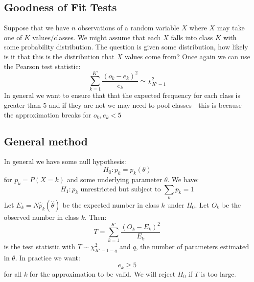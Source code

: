 \documentclass[12pt]{article}
\begin{document}
\subsection{Goodness of Fit Tests}
Suppose that we have \(n\) observations of a random variable \(X\) where \(X\) may take one of \(K\) values/classes. We might assume that each \(X\) falls into class \(K\) with some probability distribution. The question is given some distribution, how likely is it that this is the distribution that \(X\) values come from? Once again we can use the Pearson test statistic:
\[\sum^{K'}_{k=1}\frac{(o_k-e_k)^2}{e_k}\sim\chi^2_{K'-1}\]
In general we want to ensure that that the expected frequency for each class is greater than 5 and if they are not we may need to pool classes - this is because the approximation breaks for \(o_k, e_k<5\)
\subsection{General method}
In general we have some null hypothesis:
\[H_0:p_k=p_k(\theta)\]
for \(p_k=P(X=k)\) and some underlying parameter \(\theta\). We have:
\[H_1:p_k\text{ unrestricted but subject to }\sum_kp_k=1\]
Let \(E_k=N\hat{p}_k(\hat{\theta})\) be the expected number in class \(k\) under \(H_0\). Let \(O_k\) be the observed number in class \(k\). Then:
\[T=\sum^{K'}_{k=1}\frac{(O_k-E_k)^2}{E_k}\]
is the test statistic with \(T\sim\chi^2_{K'-1-q}\) and \(q\), the number of parameters estimated in \(\theta\). In practice we want:
\[e_{k}\geq 5\]
for all \(k\) for the approximation to be valid. We will reject \(H_0\) if \(T\) is too large.
\end{document}
